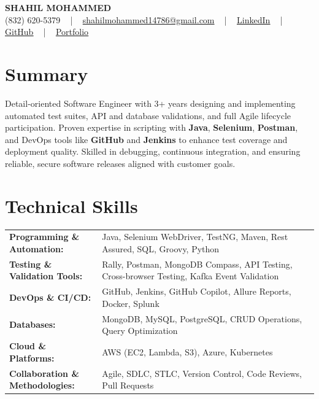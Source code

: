 \documentclass[letterpaper,11pt]{article}
\begin{document}
\begin{center}
    {\fontsize{14pt}{12pt}\selectfont \textbf{\MakeUppercase{Shahil Mohammed}}}\\ \vspace{2pt}
    \fontsize{10pt}{12pt}\selectfont (832) 620-5379 ~ | ~ \href{mailto:shahilmohammed14786@gmail.com}{shahilmohammed14786@gmail.com} ~ | ~  
    \href{https://www.linkedin.com/in/shahil-mohammed-9652931a1/}{\color{blue}\underline{LinkedIn}}  ~ | ~ 
    \href{https://github.com/freakbeast14}{\color{blue}\underline{GitHub}} ~ | ~ 
    \href{https://shahil-mohammed.netlify.app/}{\color{blue}\underline{Portfolio}}
    \vspace{-8pt}
\end{center}

\section{Summary}
\fontsize{9pt}{10pt}\selectfont
Detail-oriented Software Engineer with 3+ years designing and implementing automated test suites, API and database validations, and full Agile lifecycle participation. Proven expertise in scripting with \textbf{Java}, \textbf{Selenium}, \textbf{Postman}, and DevOps tools like \textbf{GitHub} and \textbf{Jenkins} to enhance test coverage and deployment quality. Skilled in debugging, continuous integration, and ensuring reliable, secure software releases aligned with customer goals.
 \vspace{-5pt}
 
\section{Technical Skills}
        \vspace{-14pt}
        \begin{table}[h]
            \fontsize{9pt}{10pt}\selectfont
            \begin{tabular}{p{0.3\linewidth} p{0.7\linewidth}}
                \textbf{Programming \& Automation:} & Java, Selenium WebDriver, TestNG, Maven, Rest Assured, SQL, Groovy, Python \\
                \textbf{Testing \& Validation Tools:} & Rally, Postman, MongoDB Compass, API Testing, Cross-browser Testing, Kafka Event Validation \\
                \textbf{DevOps \& CI/CD:} & GitHub, Jenkins, GitHub Copilot, Allure Reports, Docker, Splunk \\
                \textbf{Databases:} & MongoDB, MySQL, PostgreSQL, CRUD Operations, Query Optimization \\
                \textbf{Cloud \& Platforms:} & AWS (EC2, Lambda, S3), Azure, Kubernetes \\
                \textbf{Collaboration \& Methodologies:} & Agile, SDLC, STLC, Version Control, Code Reviews, Pull Requests \\
            \end{tabular}
        \end{table}
 \vspace{-15pt}
 
\end{document}
